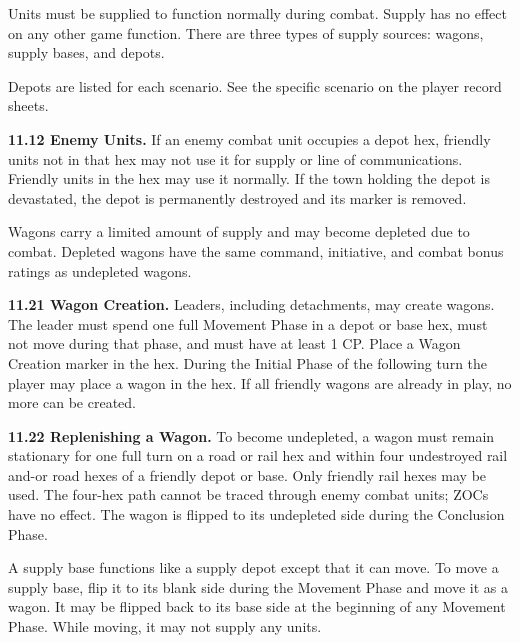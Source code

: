
Units must be supplied to function normally during combat. Supply has no effect on any other game function. There are three types of supply sources: wagons, supply bases, and depots.


Depots are listed for each scenario. See the specific scenario on the player record sheets.

\textbf{11.12 Enemy Units.} If an enemy combat unit occupies a depot hex, friendly units not in that hex may not use it for supply or line of communications. Friendly units in the hex may use it normally. If the town holding the depot is devastated, the depot is permanently destroyed and its marker is removed.


Wagons carry a limited amount of supply and may become depleted due to combat. Depleted wagons have the same command, initiative, and combat bonus ratings as undepleted wagons.

\textbf{11.21 Wagon Creation.} Leaders, including detachments, may create wagons. The leader must spend one full Movement Phase in a depot or base hex, must not move during that phase, and must have at least 1 CP. Place a Wagon Creation marker in the hex. During the Initial Phase of the following turn the player may place a wagon in the hex. If all friendly wagons are already in play, no more can be created.

\textbf{11.22 Replenishing a Wagon.} To become undepleted, a wagon must remain stationary for one full turn on a road or rail hex and within four undestroyed rail and-or road hexes of a friendly depot or base. Only friendly rail hexes may be used. The four-hex path cannot be traced through enemy combat units; ZOCs have no effect. The wagon is flipped to its undepleted side during the Conclusion Phase.


A supply base functions like a supply depot except that it can move. To move a supply base, flip it to its blank side during the Movement Phase and move it as a wagon. It may be flipped back to its base side at the beginning of any Movement Phase. While moving, it may not supply any units.
